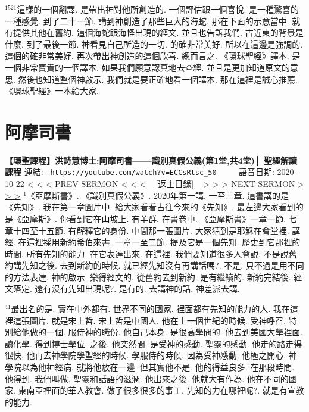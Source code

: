 \documentclass{book}
\begin{document}
$^{1521}$這樣的一個翻譯.
是帶出神對他所創造的.
一個評估跟一個喜悅.
是一種驚喜的一種感覺.
到了二十一節.
講到神創造了那些巨大的海蛇.
那在下面的示意當中.
就有提供其他在舊約.
這個海蛇跟海怪出現的經文.
並且也告訴我們.
古近東的背景是什麼.
到了最後一節.
神看見自己所造的一切.
的確非常美好.
所以在這邊是強調的.
這個的確非常美好.
再次帶出神創造的這個欣喜.
總而言之.
《環球聖經》譯本.
是一個非常寶貴的一個譯本.
如果我們願意認真地去查經.
並且是更加知道原文的意思.
然後也知道整個神啟示.
我們就是要正確地看一個譯本.
那在這裡是誠心推薦.
《環球聖經》一本給大家.
\newpage



\section{阿摩司書}
\label{sec:ECCsRtsc_50}
\textbf{【環聖課程】洪詩慧博士:阿摩司書——識別真假公義(第1堂,共4堂)│ 聖經解讀課程}
\newline
\newline
連結: \href{https://youtube.com/watch?v=ECCsRtsc_50}{\texttt{ https://youtube.com/watch?v=ECCsRtsc\_50}} ~~~~ 語音日期: 2020-10-22 
\newline
\newline
\hyperref[sec:I0SwLQsiJOs]{\small{< < < PREV SERMON < < <}}
~
\hyperref[sec:index]{\small{[返主目錄]}}
~
\hyperref[sec:g1wzcqEF6WA]{\small{> > > NEXT SERMON > > >}}
\newline
\newline
$^{1}$《亞摩斯書》.
《識別真假公義》.
2020年第一講.
一至三章.
這書講的是《先知》.
我在第一章圖片中.
給大家看看古往今來的《先知》.
最左邊大家看到的是《亞摩斯》.
你看到它在山坡上.
有羊群.
在書卷中.
《亞摩斯書》一章一節.
七章十四至十五節.
有解釋它的身份.
中間那一張圖片.
大家猜到是耶穌在會堂裡.
講經.
在這裡採用新約希伯來書.
一章一至二節.
提及它是一個先知.
歷史到它那裡的時間.
所有先知的能力.
在它表達出來.
在這裡.
我們要知道很多人會說.
不是說舊約講先知之後.
去到新約的時候.
就已經先知沒有再講話嗎?.
不是.
只不過是用不同的方法表達.
神的啟示.
樂得經文的.
從舊約去到新約.
是有繼續的.
新約完結後.
經文落定.
還有沒有先知出現呢?.
是有的.
去講神的話.
神差派去講.

$^{41}$最出名的是.
實在中外都有.
世界不同的國家.
裡面都有先知的能力的人.
我在這裡這張圖片.
就是宋上哲.
宋上哲是中國人.
他在上一個世紀的時候.
受神呼召.
特別給他做的一個.
服侍神的職份.
他自己本身.
是很高學問的.
他去到美國大學裡面.
讀化學.
得到博士學位.
之後.
他突然間.
是受神的感動.
聖靈的感動.
他走的路走得很快.
他再去神學院學聖經的時候.
學服侍的時候.
因為受神感動.
他極之開心.
神學院以為他神經病.
就將他放在一邊.
但其實他不是.
他的得益良多.
在那段時間.
他得到.
我們叫做.
聖靈和話語的滋潤.
他出來之後.
他就大有作為.
他在不同的國家.
東南亞裡面的華人教會.
做了很多很多的事工.
先知的力在哪裡呢?.
就是有宣教的能力.
\end{document}
